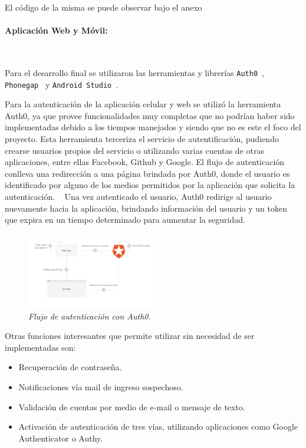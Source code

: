 El código de la misma se puede observar bajo el anexo~


\paragraph{Aplicación Web y Móvil:}\

Para el desarrollo final se utilizaron las herramientas y librerías \lstinline[columns=fixed]{Auth0}~\cite{Auth0}, \lstinline[columns=fixed]{Phonegap}~\cite{Phonegap} y \lstinline[columns=fixed]{Android Studio}~\cite{AndroidStudio}.

Para la autenticación de la aplicación celular y web se utilizó la herramienta Auth0, ya que provee funcionalidades muy completas que no podrían haber sido implementadas debido a los tiempos manejados y siendo que no es este el foco del proyecto.
Esta herramienta terceriza el servicio de autentificación, pudiendo crearse usuarios propios del servicio o utilizando varias cuentas de otras aplicaciones, entre ellas Facebook, Github y Google.
El flujo de autenticación conlleva una redirección a una página brindada por Auth0, donde el usuario es identificado por alguno de los medios permitidos por la aplicación que solicita la autenticación. ~
Una vez autenticado el usuario, Auth0 redirige al usuario nuevamente hacia la aplicación, brindando información del usuario y un token que expira en un tiempo determinado para aumentar la seguridad.

\begin{figure}[H]
  \centering
  \includegraphics[width=0.5\textwidth, keepaspectratio]{images/auth0}
  \caption{\textit{Flujo de autenticación con Auth0.}}
  \label{fig:auth0-flow}
\end{figure}

Otras funciones interesantes que permite utilizar sin necesidad de ser implementadas son:

\begin{itemize}
  \item Recuperación de contraseña.
  \item Notificaciones vía mail de ingreso sospechoso.
  \item Validación de cuentas por medio de e-mail o mensaje de texto.
  \item Activación de autenticación de tres vías, utilizando aplicaciones como Google Authenticator o Authy.
\end{itemize}

